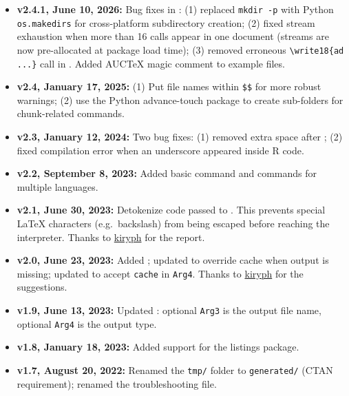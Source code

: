 \documentclass{ltxdoc}
\newcommand{\pkg}[1]{\textsf{#1}}
\begin{document}
\begin{itemize}
\item \textbf{v2.4.1, June 10, 2026:}
  Bug fixes in : (1) replaced \texttt{mkdir -p} with
  Python \texttt{os.makedirs} for cross-platform subdirectory creation;
  (2) fixed stream exhaustion when more than 16  calls
  appear in one document (streams are now pre-allocated at package load
  time); (3) removed erroneous \verb|\write18{ad ...}| call in
  .
  Added AUCTeX magic comment to example files.

\item \textbf{v2.4, January 17, 2025:}
  (1) Put file names within \texttt{\$\$} for more robust warnings;
  (2) use the Python \pkg{advance-touch} package to create sub-folders
  for chunk-related commands.

\item \textbf{v2.3, January 12, 2024:}
  Two bug fixes: (1) removed extra space after ;
  (2) fixed compilation error when an underscore appeared inside R code.

\item \textbf{v2.2, September 8, 2023:}
  Added  basic command and  commands for
  multiple languages.

\item \textbf{v2.1, June 30, 2023:}
  Detokenize code passed to .  This prevents special
  \LaTeX{} characters (e.g.\ backslash) from being escaped before
  reaching the interpreter.  Thanks to
  \href{https://github.com/kiryph}{kiryph} for the report.

\item \textbf{v2.0, June 23, 2023:}
  Added ; updated  to override cache
  when output is missing; updated  to accept \texttt{cache}
  in \texttt{Arg4}.  Thanks to
  \href{https://github.com/kiryph}{kiryph} for the suggestions.

\item \textbf{v1.9, June 13, 2023:}
  Updated : optional \texttt{Arg3} is the output file name,
  optional \texttt{Arg4} is the output type.

\item \textbf{v1.8, January 18, 2023:}
  Added support for the \pkg{listings} package.

\item \textbf{v1.7, August 20, 2022:}
  Renamed the \texttt{tmp/} folder to \texttt{generated/} (CTAN
  requirement); renamed the troubleshooting file.


\end{itemize}
\end{document}
